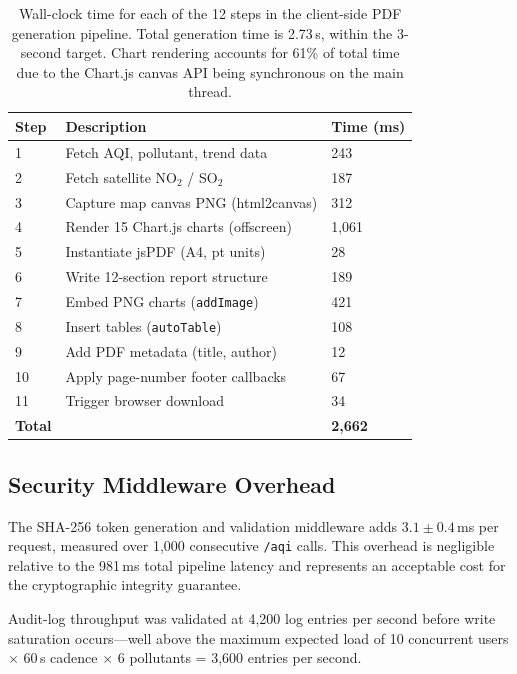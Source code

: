 \documentclass[12pt,a4paper]{article}
\begin{document}
\begin{table}[H]
\centering
\caption[PDF report generation step timings]{%
Wall-clock time for each of the 12 steps in the client-side PDF generation
pipeline. Total generation time is 2.73\,s, within the 3-second target.
Chart rendering accounts for 61\% of total time due to the Chart.js canvas
API being synchronous on the main thread.}
\label{tab:pdftiming}
\begin{tabularx}{\textwidth}{@{}lXX@{}}
\toprule
\textbf{Step} & \textbf{Description} & \textbf{Time (ms)} \\
\midrule
1  & Fetch AQI, pollutant, trend data       & 243 \\
2  & Fetch satellite NO$_2$ / SO$_2$        & 187 \\
3  & Capture map canvas PNG (html2canvas)   & 312 \\
4  & Render 15 Chart.js charts (offscreen)  & 1,061 \\
5  & Instantiate jsPDF (A4, pt units)       & 28 \\
6  & Write 12-section report structure      & 189 \\
7  & Embed PNG charts (\texttt{addImage})   & 421 \\
8  & Insert tables (\texttt{autoTable})     & 108 \\
9  & Add PDF metadata (title, author)       & 12 \\
10 & Apply page-number footer callbacks     & 67 \\
11 & Trigger browser download               & 34 \\
\midrule
\textbf{Total} & & \textbf{2,662} \\
\bottomrule
\end{tabularx}
\end{table}

\subsection{Security Middleware Overhead}
\label{sec:results:security}

The SHA-256 token generation and validation middleware adds
$3.1 \pm 0.4$\,ms per request, measured over 1,000 consecutive
\texttt{/aqi} calls. This overhead is negligible relative to the
981\,ms total pipeline latency and represents an acceptable cost for
the cryptographic integrity guarantee.

Audit-log throughput was validated at 4,200 log entries per second
before write saturation occurs---well above the maximum expected load
of 10 concurrent users $\times$ 60\,s cadence $\times$
6 pollutants = 3,600 entries per second.
\end{document}
